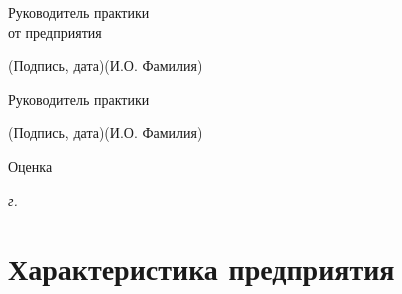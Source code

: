 \documentclass[14pt, russian]{scrartcl}
\begin{document}
\begin{titlepage}
\bigskip

\noindent \parbox{0.333\textwidth}{Руководитель практики\\от предприятия}  
\hfill \underline{\hspace{4cm}}\quad \underline{\hspace{4cm}}

\vspace{-2ex}
\noindent\hspace{13.5ex}\normalsize\hspace{170pt}\hspace{2ex}\scriptsize{(Подпись, дата)}\normalsize\hspace{30pt}\hspace{6ex}\scriptsize{(И.О. Фамилия)}\normalsize


\bigskip

\noindent Руководитель практики  \hfill \underline{\hspace{4cm}}\quad
\underline{\hspace{4cm}}

\vspace{-2ex}
\noindent\hspace{13.5ex}\normalsize\hspace{170pt}\hspace{2ex}\scriptsize{(Подпись, дата)}\normalsize\hspace{30pt}\hspace{6ex}\scriptsize{(И.О. Фамилия)}\normalsize

\vspace{2ex}
\noindent Оценка\hfill\underline{\hspace{195pt}}

\vfill

 


\begin{center}
\textsl{\the\year{} г.}
\end{center}
\end{titlepage}

\setlength{\tabcolsep}{3pt}
\newpage
\setcounter{page}{2}
\renewcommand\contentsname{\hfill{\normalfont{СОДЕРЖАНИЕ}}\hfill}  %
\tableofcontents
\newpage
\section{Характеристика предприятия}
\end{document}

